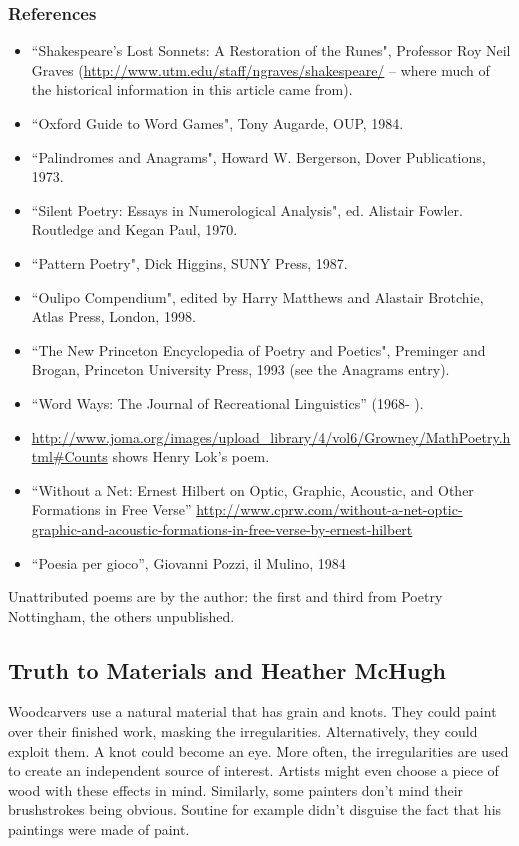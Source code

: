 \documentclass[11pt]{article}
\begin{document}
\subsubsection*{References}
\begin{itemize}
\item    “Shakespeare’s Lost Sonnets: A Restoration of the Runes", Professor Roy Neil Graves (\url{http://www.utm.edu/staff/ngraves/shakespeare/} – where much of the historical information in this article came from).
\item      “Oxford Guide to Word Games", Tony Augarde, OUP, 1984.
\item      “Palindromes and Anagrams", Howard W. Bergerson, Dover Publications, 1973.
\item      “Silent Poetry: Essays in Numerological Analysis", ed. Alistair Fowler. Routledge and Kegan Paul, 1970.
\item      “Pattern Poetry", Dick Higgins, SUNY Press, 1987.
\item      “Oulipo Compendium", edited by Harry Matthews and Alastair Brotchie, Atlas Press, London, 1998.
\item      “The New Princeton Encyclopedia of Poetry and Poetics", Preminger and Brogan, Princeton University Press, 1993 (see the Anagrams entry).
\item      “Word Ways: The Journal of Recreational Linguistics” (1968- ).
\item      \url{http://www.joma.org/images/upload_library/4/vol6/Growney/MathPoetry.html#Counts} shows Henry Lok's poem.
\item      ``Without a Net: Ernest Hilbert on Optic, Graphic, Acoustic, and Other Formations in Free Verse'' \url{http://www.cprw.com/without-a-net-optic-graphic-and-acoustic-formations-in-free-verse-by-ernest-hilbert}
\item      ``Poesia per gioco'', Giovanni Pozzi, il Mulino, 1984

\end{itemize}
Unattributed poems are by the author: the first and third from Poetry Nottingham, the others unpublished.





\newpage\subsection{Truth to Materials and Heather McHugh}
Woodcarvers use a natural material that has grain and knots. They could paint over their finished work, masking the irregularities. Alternatively, they could exploit them. A knot could become an eye. More often, the irregularities are used to create an independent source of interest. Artists might even choose a piece of wood with these effects in mind. Similarly, some painters don't mind their brushstrokes being obvious. Soutine for example didn't disguise the fact that his paintings were made of paint.
\end{document}
